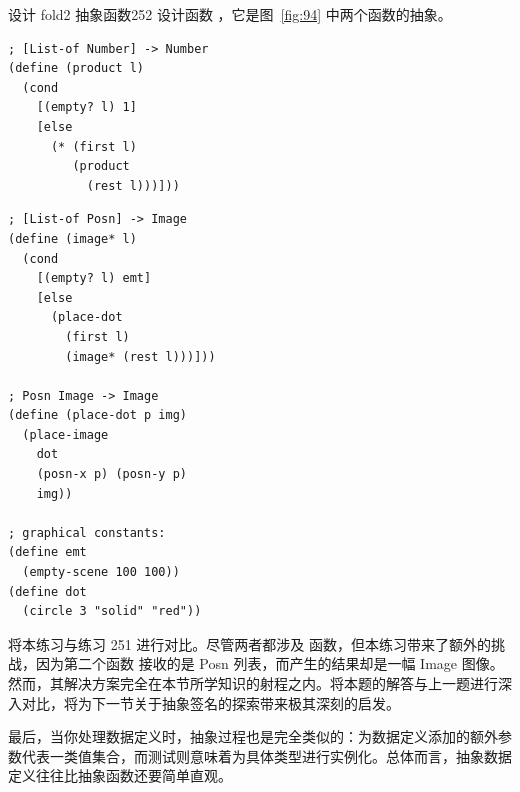 \begin{exercise}{设计 fold2 抽象函数}{252}
设计函数 ，它是图~\ref{fig:94} 中两个函数的抽象。

\begin{center}
  \begin{stepperbox}[unbreakable]
    \noindent\begin{minipage}[t]{0.48\linewidth}\vspace{0pt}
\begin{Verbatim}[commandchars=\\\{\}, fontsize=\fontsize{6.0pt}{7.2pt}\selectfont]
; [List-of Number] -> Number
(define (product l)
  (cond
    [(empty? l) 1]
    [else
      (* (first l)
         (product
           (rest l)))]))
\end{Verbatim}
    \end{minipage}\hfill
    \begin{minipage}[t]{0.48\linewidth}\vspace{0pt}
\begin{Verbatim}[commandchars=\\\{\}, fontsize=\fontsize{6.0pt}{7.2pt}\selectfont]
; [List-of Posn] -> Image
(define (image* l)
  (cond
    [(empty? l) emt]
    [else
      (place-dot
        (first l)
        (image* (rest l)))]))

; Posn Image -> Image
(define (place-dot p img)
  (place-image
    dot
    (posn-x p) (posn-y p)
    img))

; graphical constants:
(define emt
  (empty-scene 100 100))
(define dot
  (circle 3 "solid" "red"))
\end{Verbatim}
    \end{minipage}
  \end{stepperbox}
  \label{fig:94}
\end{center}

将本练习与练习 251 进行对比。尽管两者都涉及  函数，但本练习带来了额外的挑战，因为第二个函数  接收的是 Posn 列表，而产生的结果却是一幅 Image 图像。然而，其解决方案完全在本节所学知识的射程之内。将本题的解答与上一题进行深入对比，将为下一节关于抽象签名的探索带来极其深刻的启发。
\end{exercise}

最后，当你处理数据定义时，抽象过程也是完全类似的：为数据定义添加的额外参数代表一类值集合，而测试则意味着为具体类型进行实例化。总体而言，抽象数据定义往往比抽象函数还要简单直观。

